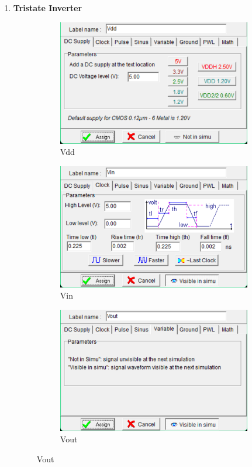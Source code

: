 \documentclass[a4paper,12pt]{article}
\begin{document}
\begin{enumerate}
\item \textbf{Tristate Inverter}
\begin{figure}[H]
	\centering
	\begin{subfigure}[t]{0.33\textwidth}
		\centering
		\includegraphics[width=1\linewidth]{images/t/vdd}
		\caption{Vdd}
	\end{subfigure}
	\hfill
	\begin{subfigure}[t]{0.32\textwidth}
		\centering
		\includegraphics[width=1\linewidth]{images/t/vin}
		\caption{Vin}
	\end{subfigure}
	\hfill
	\begin{subfigure}[t]{0.32\textwidth}
		\centering
		\includegraphics[width=1\linewidth]{images/t/vout}
		\caption{Vout}
	\end{subfigure}
	


\end{figure}
\end{enumerate}
\end{document}
